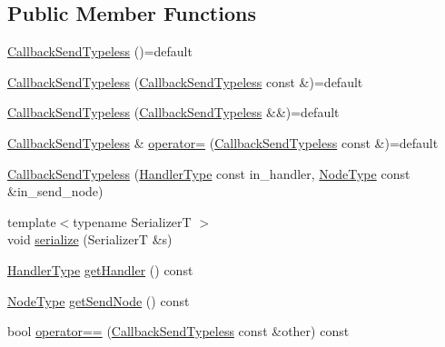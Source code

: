 \subsection*{Public Member Functions}
\begin{DoxyCompactItemize}
\item 
\hyperlink{structvt_1_1pipe_1_1callback_1_1_callback_send_typeless_a23a6190d53f6eeb5e76ddce13fe64180}{Callback\+Send\+Typeless} ()=default
\item 
\hyperlink{structvt_1_1pipe_1_1callback_1_1_callback_send_typeless_a01b989d1549051d16211f71f3f355aab}{Callback\+Send\+Typeless} (\hyperlink{structvt_1_1pipe_1_1callback_1_1_callback_send_typeless}{Callback\+Send\+Typeless} const \&)=default
\item 
\hyperlink{structvt_1_1pipe_1_1callback_1_1_callback_send_typeless_a3d85016dda42df66f15fad0e62ff3dfc}{Callback\+Send\+Typeless} (\hyperlink{structvt_1_1pipe_1_1callback_1_1_callback_send_typeless}{Callback\+Send\+Typeless} \&\&)=default
\item 
\hyperlink{structvt_1_1pipe_1_1callback_1_1_callback_send_typeless}{Callback\+Send\+Typeless} \& \hyperlink{structvt_1_1pipe_1_1callback_1_1_callback_send_typeless_ab4637d4587695d0a0883aa2f547e2b0b}{operator=} (\hyperlink{structvt_1_1pipe_1_1callback_1_1_callback_send_typeless}{Callback\+Send\+Typeless} const \&)=default
\item 
\hyperlink{structvt_1_1pipe_1_1callback_1_1_callback_send_typeless_a9e6c08acd10d99259df449b2354ba49c}{Callback\+Send\+Typeless} (\hyperlink{namespacevt_af64846b57dfcaf104da3ef6967917573}{Handler\+Type} const in\+\_\+handler, \hyperlink{namespacevt_a866da9d0efc19c0a1ce79e9e492f47e2}{Node\+Type} const \&in\+\_\+send\+\_\+node)
\item 
{\footnotesize template$<$typename SerializerT $>$ }\\void \hyperlink{structvt_1_1pipe_1_1callback_1_1_callback_send_typeless_a843c03610729c912e3019aae5c1a74a2}{serialize} (SerializerT \&s)
\item 
\hyperlink{namespacevt_af64846b57dfcaf104da3ef6967917573}{Handler\+Type} \hyperlink{structvt_1_1pipe_1_1callback_1_1_callback_send_typeless_a6792e97c34e98f4b117cae791c582317}{get\+Handler} () const
\item 
\hyperlink{namespacevt_a866da9d0efc19c0a1ce79e9e492f47e2}{Node\+Type} \hyperlink{structvt_1_1pipe_1_1callback_1_1_callback_send_typeless_a73489917b0876b98d0a8e2568148c9a8}{get\+Send\+Node} () const
\item 
bool \hyperlink{structvt_1_1pipe_1_1callback_1_1_callback_send_typeless_a0dd54476c2ab4f7222660b57e11ee659}{operator==} (\hyperlink{structvt_1_1pipe_1_1callback_1_1_callback_send_typeless}{Callback\+Send\+Typeless} const \&other) const

\end{DoxyCompactItemize}
